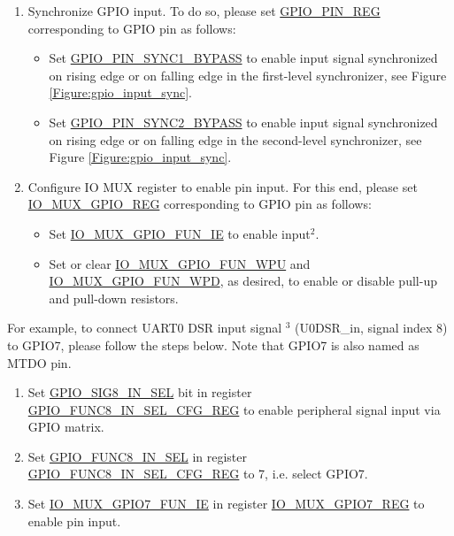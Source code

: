 \documentclass[main\_\_EN.tex]{subfiles}
\begin{document}
\begin{enumerate}
    \item \label{step:3} Synchronize GPIO input. To do so, please set \hyperref[regdesc:GPIOPINNREG]{GPIO\_PIN\_REG} corresponding to GPIO pin  as follows:
    \begin{itemize}
        \item Set \hyperref[fielddesc:GPIOPINNSYNC1BYPASS]{GPIO\_PIN\_SYNC1\_BYPASS} to enable input signal synchronized on rising edge or on falling edge in the first-level synchronizer, see Figure \ref{Figure:gpio_input_sync}.
        \item Set \hyperref[fielddesc:GPIOPINNSYNC2BYPASS]{GPIO\_PIN\_SYNC2\_BYPASS} to enable input signal synchronized on rising edge or on falling edge in the second-level synchronizer, see Figure \ref{Figure:gpio_input_sync}.
    \end{itemize}
    \item Configure IO MUX register to enable pin input. For this end, please set \hyperref[regdesc:IOMUXGPIONREG]{IO\_MUX\_GPIO\_REG} corresponding to GPIO pin  as follows:
    \begin{itemize}
        \item Set \hyperref[fielddesc:IOMUXGPIONFUNIE]{IO\_MUX\_GPIO\_FUN\_IE} to enable input\hyperref[input-note-2]{$^2$}.
        \item Set or clear \hyperref[fielddesc:IOMUXGPIONFUNWPU]{IO\_MUX\_GPIO\_FUN\_WPU} and \hyperref[fielddesc:IOMUXGPIONFUNWPD]{IO\_MUX\_GPIO\_FUN\_WPD}, as desired, to enable or disable pull-up and pull-down resistors.
    \end{itemize}
\end{enumerate}

For example, to connect UART0 DSR input signal  \hyperref[input-note-3]{$^3$} (U0DSR\_in, signal index 8) to GPIO7, please follow the steps below. Note that GPIO7 is also named as MTDO pin.

\begin{enumerate}
\item Set  \hyperref[regdesc:GPIOFUNCNINSELCFGREG]{GPIO\_SIG8\_IN\_SEL} bit in register  \hyperref[fielddesc:GPIOSIGNINSEL]{GPIO\_FUNC8\_IN\_SEL\_CFG\_REG} to enable peripheral signal input via GPIO matrix.
\item Set \hyperref[fielddesc:GPIOFUNCNINSEL]{GPIO\_FUNC8\_IN\_SEL} in register \hyperref[regdesc:GPIOFUNCNINSELCFGREG]{GPIO\_FUNC8\_IN\_SEL\_CFG\_REG} to 7, i.e. select GPIO7.
\item Set \hyperref[fielddesc:IOMUXGPIONFUNIE]{IO\_MUX\_GPIO7\_FUN\_IE} in register \hyperref[regdesc:IOMUXGPIONREG]{IO\_MUX\_GPIO7\_REG} to enable pin input.
\end{enumerate}
\end{document}
